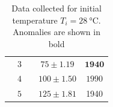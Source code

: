 \documentclass[../main.tex]{subfiles}
\begin{document}
\begin{table}[H]
{\begin{tabular}{@{}ccccc@{}}
                                                                                                & $3$                                                                                               &                                                                                                & $75 \pm 1.19$                                                                                                        & $\mathbf{1940}$                                                                                                              \\
                                                                                                & $4$                                                                                               &                                                                                                & $100 \pm 1.50$                                                                                                       & $1990$                                                                                                             \\
                                                                                                & $5$                                                                                               &                                                                                                & $125 \pm 1.81$                                                                                                       & 1940                                                                                                           \\ \bottomrule
\end{tabular}%
}
\caption{Data collected for initial temperature $T_i = \SI{28}{\celsius}$. Anomalies are shown in bold}
\label{tab:28Table}
\end{table}
\end{document}
